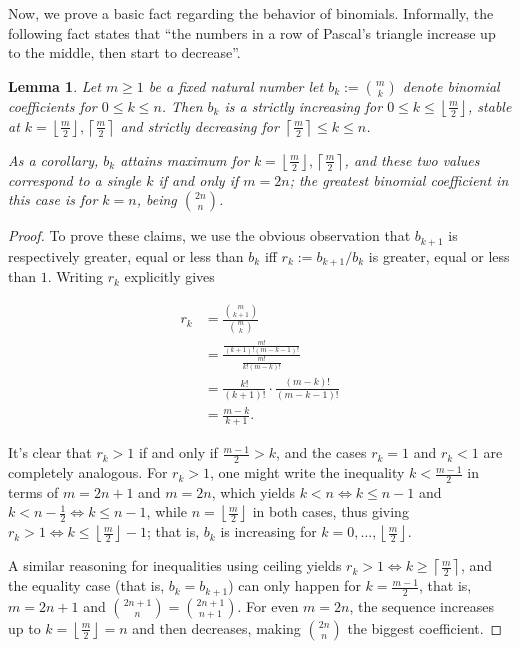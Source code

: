 \documentclass[11pt]{article}
\newtheorem{lemma}[theorem]{Lemma}
\theoremstyle{remark}
\newcommand{\floor}[1]{\left\lfloor #1 \right\rfloor}
\newcommand{\ceil}[1]{\left\lceil #1 \right\rceil}
\newcommand{\vs}{\vspace{10px}}
\begin{document}
Now, we prove a basic fact regarding the behavior of binomials. Informally, the following fact states that ``the numbers in a row of Pascal's triangle increase up to the middle, then start to decrease''. 

\begin{lemma} \label{lemma:binomial_monotonicity}
    Let $m\ge 1$ be a fixed natural number let $b_k:= \binom{m}{k}$ denote binomial coefficients for $0\le k\le n$. Then $b_k$ is a strictly increasing for $0\le k \le \floor{\frac m2}$, stable at $k=\floor{\frac m2}, \ceil{\frac m2}$ and strictly decreasing for $\ceil{\frac m2}\le k\le n$.

    As a corollary, $b_k$ attains maximum for $k= \floor{\frac m2}, \ceil{\frac m2}$, and these two values correspond to a single $k$ if and only if $m = 2n$; the greatest binomial coefficient in this case is for $k = n$, being $\binom{2n}{n}$.
\end{lemma}
\vs

\begin{proof}
    To prove these claims, we use the obvious observation that $b_{k+1}$ is respectively greater, equal or less than $b_k$ iff $r_k:=b_{k+1}/b_k$ is greater, equal or less than $1$. Writing $r_k$ explicitly gives 

    \begin{align*}
        r_k &= \frac{\binom{m}{k+1}}{\binom{m}{k}}\\
        &= \frac{\frac{m!}{(k+1)!(m-k-1)!}}{\frac{m!}{k!(m-k)!}}\\
        &= \frac{k!}{(k+1)!}\cdot \frac{(m-k)!}{(m-k-1)!}\\
        &= \frac{m-k}{k+1}.
    \end{align*}
    
    It's clear that $r_k >1$ if and only if $\frac{m-1}{2}> k$, and the cases $r_k=1$ and $r_k<1$ are completely analogous. For $r_k>1$, one might write the inequality $k<\frac{m-1}{2}$ in terms of $m=2n+1$ and $m= 2n$, which yields $k<n\iff k\le n-1$ and $k<n-\frac 12\iff k\le n-1$, while $n = \floor{\frac m2}$ in both cases, thus giving $r_k>1\iff k\le \floor{\frac m2}-1$; that is, $b_k$ is increasing for $k=0,\ldots, \floor{\frac m2}$.
    
    A similar reasoning for inequalities using ceiling yields $r_k>1\iff k\ge \ceil{\frac m2}$, and the equality case (that is, $b_k=b_{k+1}$) can only happen for $k= \frac{m-1}{2}$, that is, $m = 2n+1$ and $\binom{2n+1}{n}=\binom{2n+1}{n+1}$. For even $m=2n$, the sequence increases up to $k=\floor{\frac m2}=n$ and then decreases, making $\binom{2n}{n}$ the biggest coefficient. 
\end{proof}\vs
\end{document}
